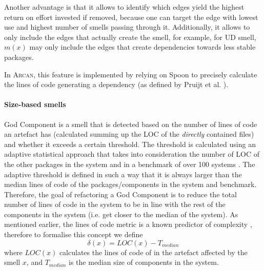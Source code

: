 Another advantage is that it allows to identify which edges yield the highest return on effort invested if removed, because one can target the edge with lowest use and highest number of smells passing through it.
Additionally, it allows to only include the edges that actually create the smell, for example, for UD smell, $m(x)$ may only include the edges that create dependencies towards less stable packages.

In \textsc{Arcan}, this feature is implemented by relying on Spoon \cite{Pawlak2015} to precisely calculate the lines of code generating a dependency (as defined by Pruijt et al. \cite{Pruijt2017}).

\paragraph{Size-based smells}
God Component is a smell that is detected based on the number of lines of code an artefact has (calculated summing up the LOC of the \emph{directly} contained files) and whether it exceeds a certain threshold.
The threshold is calculated using an adaptive statistical approach that takes into consideration  the number of LOC of the other packages in the system and in a benchmark of over 100 systems \cite{Arcelli2015}.
The adaptive threshold is defined in such a way that it is always larger than the median lines of code of the packages/components in the system and benchmark.
Therefore, the goal of refactoring a God Component is to reduce the total number of lines of code in the system to be in line with the rest of the components in the system (i.e. get closer to the median of the system).
As mentioned earlier, the lines of code metric is a known predictor of complexity \cite{Lippert2006, Morasca2001, Kitchenham2004}, therefore to formalise this concept we define 
\begin{equation}\label{c6:eq:smell-extent-gc-threshold}
    \delta(x) = LOC(x) - T_{median}   
\end{equation}
where $LOC(x)$ calculates the lines of code of in the artefact affected by the smell $x$, and $T_{median}$ is the median size of components in the system.

